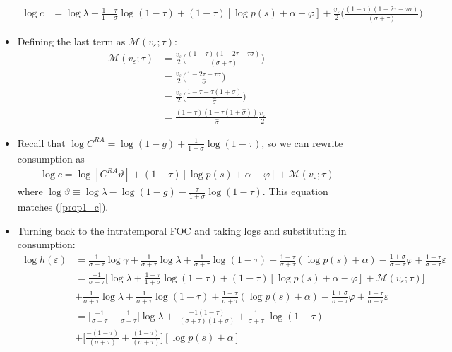 \documentclass{article}
\newcommand{\M}{\mathcal{M}}
\begin{document}
\begin{itemize}
\begin{align*}
\log c &= \log \lambda + \frac{1-\tau}{1 +\sigma}\log(1-\tau) + (1-\tau)[\log p(s) + \alpha - \varphi] + \frac{v_\varepsilon}{2}\Bigg( \frac{(1-\tau)(1-2\tau-\tau\sigma)}{(\sigma+\tau)}\Bigg)
\end{align*}
\item Defining the last term as $\M ( v_\varepsilon; \tau)$:
\begin{align*}
\M ( v_\varepsilon; \tau) 
&= \frac{v_\varepsilon}{2}\Bigg( \frac{(1-\tau)(1-2\tau-\tau\sigma)}{(\sigma+\tau)}\Bigg)\\
&= \frac{v_\varepsilon}{2}\Bigg( \frac{1-2\tau-\tau\sigma}{\hat \sigma}\Bigg)\\
&= \frac{v_\varepsilon}{2}\Bigg( \frac{1-\tau-\tau(1+\sigma)}{\hat \sigma}\Bigg)\\
&= \frac{(1-\tau)(1 - \tau(1+\hat \sigma))}{\hat \sigma} \frac{v_\varepsilon}{2}
\end{align*}
\item Recall that $\log C^{RA} = \log (1 - g) +  \frac{1}{1 + \sigma} \log ( 1 - \tau)$, so we can rewrite consumption as
\begin{align*}
\log c = \log [C^{RA}\vartheta] + (1 - \tau) [\log p(s) + \alpha - \varphi] + \M (v_\varepsilon; \tau)
\end{align*}
where $\log \vartheta \equiv \log \lambda - \log(1-g) - \frac{\tau}{1+\sigma} \log(1-\tau)$. This equation matches (\ref{prop1_c}).
\item Turning back to the intratemporal FOC and taking logs and substituting in consumption:
\begin{align*}
\log h(\varepsilon) 
&= \frac{1}{\sigma+\tau}\log\gamma + \frac{1}{\sigma+\tau} \log \lambda + \frac{1}{\sigma+\tau} \log(1-\tau) + \frac{1-\tau}{\sigma +\tau}(\log p(s)+ \alpha)-\frac{1+\sigma}{\sigma+\tau} \varphi   +  \frac{1-\tau}{\sigma+\tau} \varepsilon  \\
&= \frac{-1}{\sigma+\tau}\Bigg[ \log \lambda + \frac{1-\tau}{1 +\sigma}\log(1-\tau) + (1-\tau)[\log p(s) + \alpha - \varphi] + \M ( v_\varepsilon; \tau) \Bigg] \\
&+ \frac{1}{\sigma+\tau} \log \lambda + \frac{1}{\sigma+\tau} \log(1-\tau) + \frac{1-\tau}{\sigma +\tau}(\log p(s)+ \alpha)-\frac{1+\sigma}{\sigma+\tau} \varphi   +  \frac{1-\tau}{\sigma+\tau} \varepsilon\\
&= \Bigg[\frac{-1}{\sigma + \tau} + \frac{1}{\sigma + \tau}  \Bigg] \log \lambda
+ \Bigg[\frac{-1(1-\tau)}{(\sigma + \tau)(1+\sigma)} + \frac{1}{\sigma + \tau}\Bigg] \log (1-\tau)
\\&+ \Bigg[\frac{-(1-\tau)}{(\sigma + \tau)} + \frac{(1-\tau)}{(\sigma+\tau)}\Bigg] [\log p(s) + \alpha]

\end{align*}
\end{itemize}
\end{document}
